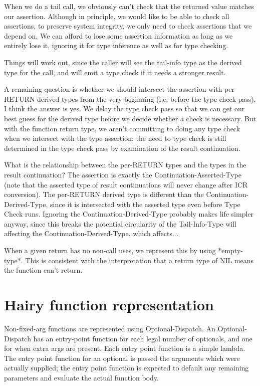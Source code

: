 When we do a tail call, we obviously can't check that the returned value
matches our assertion.  Although in principle, we would like to be able to
check all assertions, to preserve system integrity, we only need to check
assertions that we depend on.  We can afford to lose some assertion information
as long as we entirely lose it, ignoring it for type inference as well as for
type checking.

Things will work out, since the caller will see the tail-info type as the
derived type for the call, and will emit a type check if it needs a stronger
result.

A remaining question is whether we should intersect the assertion with
per-RETURN derived types from the very beginning (i.e. before the type check
pass).  I think the answer is yes.  We delay the type check pass so that we can
get our best guess for the derived type before we decide whether a check is
necessary.  But with the function return type, we aren't committing to doing
any type check when we intersect with the type assertion; the need to type
check is still determined in the type check pass by examination of the result
continuation.

What is the relationship between the per-RETURN types and the types in the
result continuation?  The assertion is exactly the Continuation-Asserted-Type
(note that the asserted type of result continuations will never change after
ICR conversion).  The per-RETURN derived type is different than the
Continuation-Derived-Type, since it is intersected with the asserted type even
before Type Check runs.  Ignoring the Continuation-Derived-Type probably makes
life simpler anyway, since this breaks the potential circularity of the
Tail-Info-Type will affecting the Continuation-Derived-Type, which affects...

When a given return has no non-call uses, we represent this by using
*empty-type*.  This is consistent with the interpretation that a return type of
NIL means the function can't return.


\section{Hairy function representation}

Non-fixed-arg functions are represented using Optional-Dispatch.  An
Optional-Dispatch has an entry-point function for each legal number of
optionals, and one for when extra args are present.  Each entry point function
is a simple lambda.  The entry point function for an optional is passed the
arguments which were actually supplied; the entry point function is expected to
default any remaining parameters and evaluate the actual function body.

